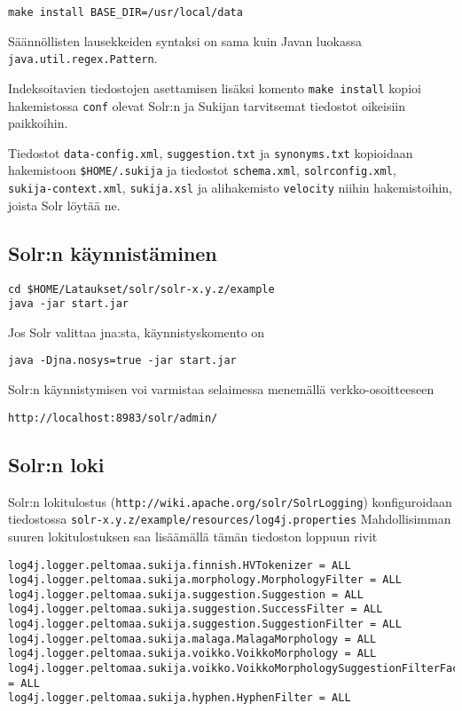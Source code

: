 \documentclass[12pt,a4paper]{scrartcl}
\begin{document}
\verb|make install BASE_DIR=/usr/local/data|

Säännöllisten lausekkeiden syntaksi on sama kuin Javan luokassa \\
\verb=java.util.regex.Pattern=.

Indeksoitavien tiedostojen asettamisen lisäksi komento
\verb=make install= kopioi hakemistossa \verb=conf= olevat Solr:n ja
Sukijan tarvitsemat tiedostot oikeisiin paikkoihin.

Tiedostot
\verb=data-config.xml=,
\verb=suggestion.txt= ja
\verb=synonyms.txt=
kopioidaan hakemistoon \verb=$HOME/.sukija=
ja tiedostot
\verb=schema.xml=,
\verb=solrconfig.xml=, \\
\verb=sukija-context.xml=,
\verb=sukija.xsl= ja
alihakemisto \verb=velocity=
niihin hakemistoihin, joista Solr löytää ne.


\subsection*{Solr:n käynnistäminen}

\begin{verbatim}
cd $HOME/Lataukset/solr/solr-x.y.z/example
java -jar start.jar
\end{verbatim}

Jos Solr valittaa jna:sta, käynnistyskomento on

\begin{verbatim}
java -Djna.nosys=true -jar start.jar
\end{verbatim}

Solr:n käynnistymisen voi varmistaa selaimessa menemällä verkko-osoitteeseen

\verb|http://localhost:8983/solr/admin/|


\subsection*{Solr:n loki}

Solr:n lokitulostus (\verb=http://wiki.apache.org/solr/SolrLogging=)
konfiguroidaan tiedostossa
\verb=solr-x.y.z/example/resources/log4j.properties=
Mahdollisimman suuren lokitulostuksen saa lisäämällä tämän tiedoston
loppuun rivit

\begin{verbatim}
log4j.logger.peltomaa.sukija.finnish.HVTokenizer = ALL
log4j.logger.peltomaa.sukija.morphology.MorphologyFilter = ALL
log4j.logger.peltomaa.sukija.suggestion.Suggestion = ALL
log4j.logger.peltomaa.sukija.suggestion.SuccessFilter = ALL
log4j.logger.peltomaa.sukija.suggestion.SuggestionFilter = ALL
log4j.logger.peltomaa.sukija.malaga.MalagaMorphology = ALL
log4j.logger.peltomaa.sukija.voikko.VoikkoMorphology = ALL
log4j.logger.peltomaa.sukija.voikko.VoikkoMorphologySuggestionFilterFactory = ALL
log4j.logger.peltomaa.sukija.hyphen.HyphenFilter = ALL
\end{verbatim}
\end{document}
